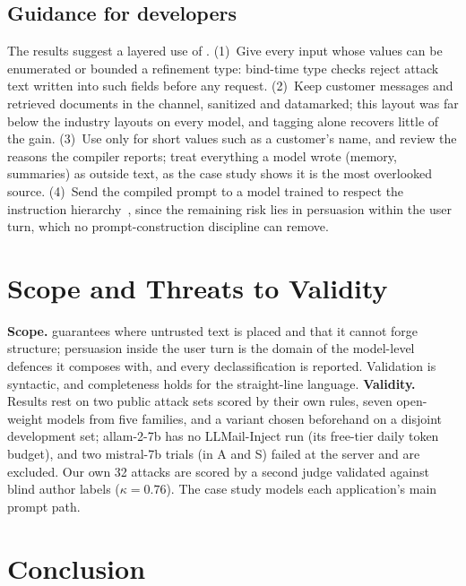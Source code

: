 \documentclass[conference]{IEEEtran}
\begin{document}
\subsection{Guidance for developers}
The results suggest a layered use of \TL{}. (1)~Give every input whose values can be enumerated or bounded a refinement type: bind-time type checks reject attack text written into such fields before any request. (2)~Keep customer messages and retrieved documents in the  channel, sanitized and datamarked; this layout was far below the industry layouts on every model, and tagging alone recovers little of the gain. (3)~Use  only for short values such as a customer's name, and review the reasons the compiler reports; treat everything a model wrote (memory, summaries) as outside text, as the case study shows it is the most overlooked source. (4)~Send the compiled prompt to a model trained to respect the instruction hierarchy~\cite{wallace2024hierarchy}, since the remaining risk lies in persuasion within the user turn, which no prompt-construction discipline can remove.

\section{Scope and Threats to Validity}

\textbf{Scope.} \TL{} guarantees where untrusted text is placed and that it cannot forge structure; persuasion inside the user turn is the domain of the model-level defences it composes with, and every declassification is reported. Validation is syntactic, and completeness holds for the straight-line language. \textbf{Validity.} Results rest on two public attack sets scored by their own rules, seven open-weight models from five families, and a variant chosen beforehand on a disjoint development set; allam-2-7b has no LLMail-Inject run (its free-tier daily token budget), and two mistral-7b trials (in A and S) failed at the server and are excluded. Our own 32 attacks are scored by a second judge validated against blind author labels ($\kappa=0.76$). The case study models each application's main prompt path.

\section{Conclusion}
\end{document}

